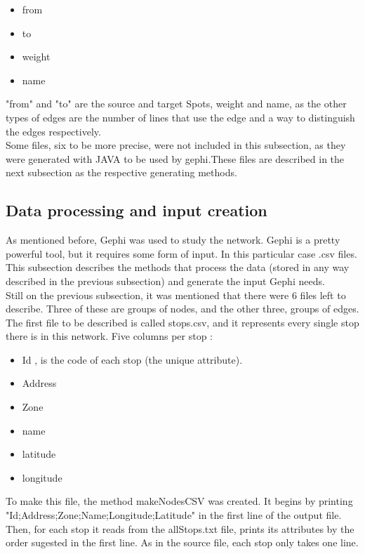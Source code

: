 \documentclass[12pt]{article}
\begin{document}
\begin{multicols}{2}
\begin{itemize}
    \item from
    \item to
    \item weight
    \item name
\end{itemize}

"from" and "to" are the source and target Spots, weight and name, as the other types of edges are the number of lines that use the edge and a way to distinguish the edges respectively.\\
Some files, six to be more precise, were not included in this subsection, as they were generated with JAVA to be used by gephi.These files are described in the next subsection as the respective generating methods.

\subsection{Data processing and input creation}
	
	As mentioned before, Gephi was used to study the network. Gephi is a pretty powerful tool, but it requires some form of input. In this particular case .csv files. This subsection describes the methods that process the data (stored in any way described in the previous subsection) and generate the input Gephi needs.\\
	Still on the previous subsection, it was mentioned that there were 6 files left to describe. Three of these are groups of nodes, and the other three, groups of edges.\\
	
	
The first file to be described is called stops.csv, and it represents every single stop there is in this network. Five columns per stop :
	
	\begin{itemize}
		\item Id , is the code of each stop (the unique attribute).
		\item Address
		\item Zone
		\item name
		\item latitude
		\item longitude
	\end{itemize}
	
	To make this file, the method makeNodesCSV was created.
	It begins by printing "Id;Address;Zone;Name;Longitude;Latitude" in the first line of the output file. Then, for each stop it reads from the allStops.txt file, prints its attributes by the order sugested in the first line. As in the source file, each stop only takes one line.
	

\end{multicols}
\end{document}
